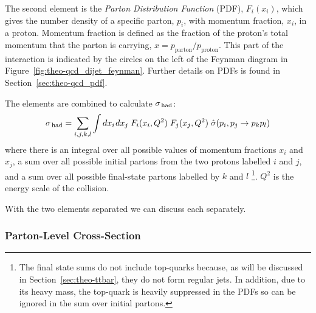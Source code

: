The second element is the \textit{Parton Distribution Function} (PDF), $F_i(x_i)$,
which gives the number density of a specific parton, $p_i$, with momentum fraction, $x_i$, in a proton.
Momentum fraction is defined as the fraction of the proton's total momentum that the parton is carrying, $x = p_{\text{parton}}/p_{\text{proton}}$.
This part of the interaction is indicated by the circles on the left of the Feynman diagram in Figure~\ref{fig:theo-qcd_dijet_feynman}.
Further details on PDFs is found in Section~\ref{sec:theo-qcd_pdf}.

The elements are combined to calculate $\sigma_{\text{\,had}}$:
\begin{equation}
  \sigma_{\text{\,had}} = \sum_{i,j,k,l} \int dx_i\hspace{0.3mm} dx_j \hspace{1mm} F_i(x_i,Q^2)\hspace{1mm}F_j(x_j,Q^2)\hspace{1mm}\hat{\sigma}(p_i, p_j\to p_k p_l)
\end{equation}
where there is an integral over all possible values of momentum fractions $x_i$ and $x_j$,
a sum over all possible initial partons from the two protons labelled $i$ and $j$,
and a sum over all possible final-state partons labelled by $k$ and $l$
\footnote{The final state sums do not include top-quarks because, as will be discussed in Section~\ref{sec:theo-ttbar}, they do not form regular jets. 
  In addition, due to its heavy mass, the top-quark is heavily suppressed in the PDFs so can be ignored in the sum over initial partons.}.
$Q^2$ is the energy scale of the collision.

\noindent
With the two elements separated we can discuss each separately.

\subsubsection{Parton-Level Cross-Section}
\label{sec:theo-qcd_dijet_xs}

